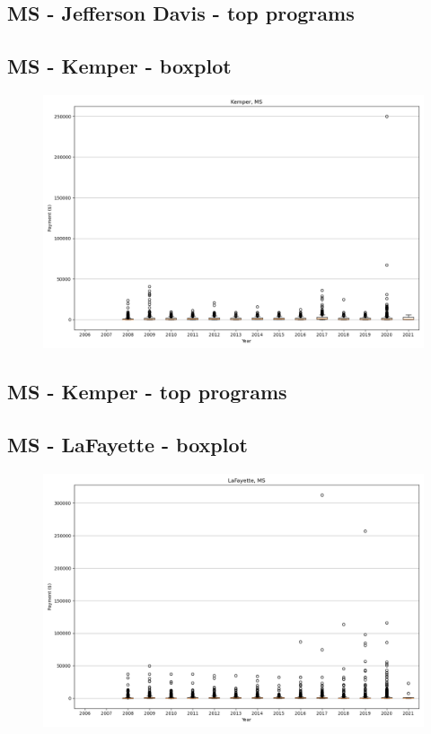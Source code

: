 \subsection*{MS - Jefferson Davis - top programs}

\newpage
\subsection*{MS - Kemper - boxplot}
\begin{figure}[h]
\centering
\includegraphics[width=7in]{../output/boxplots/counties/Kemper-MS_boxplot.png}
\end{figure}


\subsection*{MS - Kemper - top programs}

\newpage
\subsection*{MS - LaFayette - boxplot}
\begin{figure}[h]
\centering
\includegraphics[width=7in]{../output/boxplots/counties/LaFayette-MS_boxplot.png}
\end{figure}


